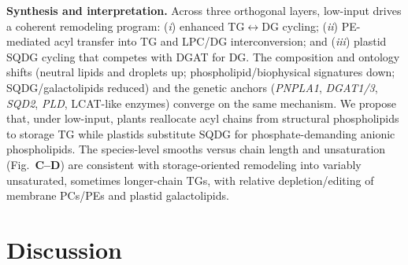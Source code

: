 \documentclass[10pt,letterpaper]{article}
\begin{document}
\begin{itemize}
\noindent \textbf{Synthesis and interpretation.}
Across three orthogonal layers, low-input drives a coherent remodeling program: (\emph{i}) enhanced TG$\leftrightarrow$DG cycling; (\emph{ii}) PE-mediated acyl transfer into TG and LPC/DG interconversion; and (\emph{iii}) plastid SQDG cycling that competes with DGAT for DG. The composition and ontology shifts (neutral lipids and droplets up; phospholipid/biophysical signatures down; SQDG/galactolipids reduced) and the genetic anchors (\textit{PNPLA1}, \textit{DGAT1/3}, \textit{SQD2}, \textit{PLD}, LCAT-like enzymes) converge on the same mechanism. We propose that, under low-input, plants reallocate acyl chains from structural phospholipids to storage TG while plastids substitute SQDG for phosphate-demanding anionic phospholipids. The species-level smooths versus chain length and unsaturation (Fig.\ \textbf{C–D}) are consistent with storage-oriented remodeling into variably unsaturated, sometimes longer-chain TGs, with relative depletion/editing of membrane PCs/PEs and plastid galactolipids.













\section*{Discussion}


\end{itemize}
\end{document}
